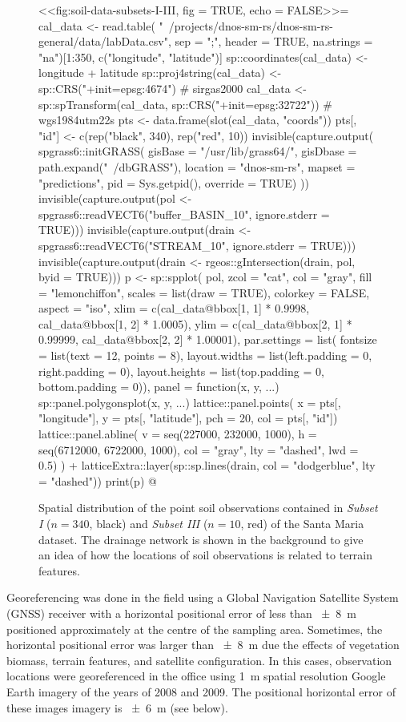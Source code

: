 \begin{figure}[!ht]
\centering
<<fig:soil-data-subsets-I-III, fig = TRUE, echo = FALSE>>=
cal_data <- read.table(
 "~/projects/dnos-sm-rs/dnos-sm-rs-general/data/labData.csv", sep = ";",
 header = TRUE, na.strings = "na")[1:350, c("longitude", "latitude")]
sp::coordinates(cal_data) <- ~ longitude + latitude
sp::proj4string(cal_data) <- sp::CRS("+init=epsg:4674") # sirgas2000
cal_data <- sp::spTransform(cal_data, sp::CRS("+init=epsg:32722")) # wgs1984utm22s
pts <- data.frame(slot(cal_data, "coords"))
pts[, "id"] <- c(rep("black", 340), rep("red", 10))
invisible(capture.output(
 spgrass6::initGRASS(
   gisBase = "/usr/lib/grass64/", gisDbase = path.expand("~/dbGRASS"),
   location = "dnos-sm-rs", mapset = "predictions", pid = Sys.getpid(),
   override = TRUE)
))
invisible(capture.output(pol <- spgrass6::readVECT6("buffer_BASIN_10", ignore.stderr = TRUE)))
invisible(capture.output(drain <- spgrass6::readVECT6("STREAM_10", ignore.stderr = TRUE)))
invisible(capture.output(drain <- rgeos::gIntersection(drain, pol, byid = TRUE)))
p <- sp::spplot(
 pol, zcol = "cat", col = "gray", fill = "lemonchiffon",
 scales = list(draw = TRUE),
 colorkey = FALSE, aspect = "iso",
 xlim = c(cal_data@bbox[1, 1] * 0.9998, cal_data@bbox[1, 2] * 1.0005),
 ylim = c(cal_data@bbox[2, 1] * 0.99999, cal_data@bbox[2, 2] * 1.00001),
 par.settings = list(
   fontsize = list(text = 12, points = 8),
   layout.widths = list(left.padding = 0, right.padding = 0),
   layout.heights = list(top.padding = 0, bottom.padding = 0)),
 panel = function(x, y, ...) {
   sp::panel.polygonsplot(x, y, ...)
   lattice::panel.points(
     x = pts[, "longitude"], y = pts[, "latitude"], pch = 20, col = pts[, "id"])
   lattice::panel.abline(
     v = seq(227000, 232000, 1000), h = seq(6712000, 6722000, 1000),
     col = "gray", lty = "dashed", lwd = 0.5)
   }) +
 latticeExtra::layer(sp::sp.lines(drain, col = "dodgerblue", lty = "dashed"))
print(p)
@
\caption{Spatial distribution of the point soil observations contained in \emph{Subset I} ($n = 340$, black) 
and \emph{Subset III} ($n = 10$, red) of the Santa Maria dataset. The drainage network is shown in the 
background to give an idea of how the locations of soil observations is related to terrain features.}
\label{fig:soil-data-subsets-I-III}
\end{figure}

Georeferencing was done in the field using a Global Navigation Satellite System (GNSS) receiver with a 
horizontal positional error of less than \SI{\pm8}{\metre} positioned approximately at the centre of the
sampling area. Sometimes, the horizontal positional error was larger than \SI{\pm8}{\metre} due the effects
of vegetation biomass, terrain features, and satellite configuration. In this cases, observation locations 
were georeferenced in the office using \SI{1}{\metre} spatial resolution Google Earth\textregistered{} 
imagery of the years of 2008 and 2009. The positional horizontal error of these images imagery is 
\SI{\pm6}{\metre} (see below).

